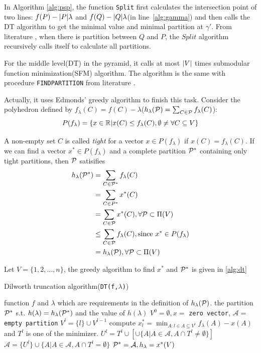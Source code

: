 \documentclass{article}
\begin{document}
In Algorithm \ref{alg:psp}, the function \texttt{Split} first calculates the intersection point of two lines: $f(P)-\abs{P}\lambda$ and $f(Q)-\abs{Q}\lambda$(in line~\ref{alg:gamma}) and then calls the DT algorithm to get the minimal value and minimal partition at $\gamma'$. From literature \cite{mac}, when there is partition between $Q$ and $P$, the $Split$ algorithm recursively calls itself to calculate all partitions.

For the middle level(DT) in the pyramid, it calls at most $\abs{V}$ times submodular function minimization(SFM) algorithm.
The algorithm is the same with procedure \texttt{FINDPARTITION} from literature \cite{mac}.

Actually, it uses Edmonds' greedy algorithm to finish this task. Consider the polyhedron defined by $f_{\lambda}(C) = f(C)-\lambda$($h_{\lambda}(\P)= \sum_{C \in \P} f_{\lambda}(C)$):
\begin{equation}
P(f_{\lambda}) = \{ x \in \R |  x(C) \leq f_{\lambda}(C), \emptyset \neq \forall C \subseteq V\}
\end{equation}

A non-empty set $C$ is called \textit{tight} for a vector $x \in P(f_{\lambda})$ if $x(C) = f_{\lambda}(C)$.
If we can find a vector $ x^* \in P(f_{\lambda}) $ and a complete partition $\P^*$ containing only tight partitions,
then $\P$ satisifies
\begin{align*}
h_{\lambda}(\P^*) &= \sum_{C \in \P^*} f_{\lambda}(C) \\
 &=\sum_{C\in P^*} x^*(C)  \\
& = \sum_{C \in \P} x^*(C), \forall \P \subset \Pi(V) \\
& \leq \sum_{C\in \P} f_{\lambda}(C), \textrm{since } x^* \in P(f_{\lambda}) \\
& = h_{\lambda}(\P),\forall \P \subset \Pi(V) 
\end{align*}

Let $V=\{1, 2, \dots, n\}$, the greedy algorithm to find $x^*$ and $\P^*$ is given in \ref{alg:dt}
\begin{algorithm}
\caption{Dilworth truncation algorithm(\texttt{DT(f,$\lambda$)})}\label{alg:dt}
\begin{algorithmic}[1]
\REQUIRE function $f$ and $\lambda$ which are requirements in the definition of $h_{\lambda}(\P)$.
\ENSURE the partition $\P^*$ s.t. $h(\lambda) = h_{\lambda}(\P^*)$ and the value of $h(\lambda)$
\STATE $V^0 = \emptyset, x = $ \texttt{zero vector}, $\mathcal{A} = $ \texttt{empty partition} 
\STATE $V^l = \{l\} \cup V^{l-1}$
\STATE\label{alg:tight} compute $x^*_l = \displaystyle\min_{ A: l \in A \subseteq V^l} f_{\lambda}(A)- x(A)$ and $T^l$ is one of the minimizer.
\STATE $U^l = T^l \cup [\cup \{A | A \in \mathcal{A}, A \cap T^l \neq \emptyset\}] $
\STATE $\mathcal{A} = \{U^l\} \cup \{A | A \in \mathcal{A}, A \cap T^l = \emptyset \}$
\ENDFOR
\STATE $\P^* = \mathcal{A}, h_{\lambda} = x^*(V)$
\end{algorithmic}
\end{algorithm}
\end{document}
